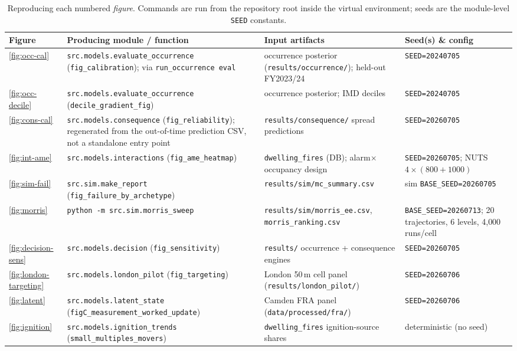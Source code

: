 \begin{table}[htbp]
  \centering
  \small
  \setlength{\tabcolsep}{4pt}
  \caption{Reproducing each numbered \emph{figure}. Commands are run from the
  repository root inside the virtual environment; seeds are the module-level
  \texttt{SEED} constants.}
  \label{tab:repro-fig1}
  \begin{tabular}{@{}p{1.5cm}p{4.4cm}p{4.0cm}p{4.3cm}@{}}
    \toprule
    Figure & Producing module / function & Input artifacts & Seed(s) \& config \\
    \midrule
    \ref{fig:occ-cal} & \texttt{src.models.evaluate\_occurrence}
      (\texttt{fig\_calibration}); via \texttt{run\_occurrence eval}
      & occurrence posterior (\texttt{results/occurrence/}); held-out FY2023/24
      & \texttt{SEED=20240705} \\
    \ref{fig:occ-decile} & \texttt{src.models.evaluate\_occurrence}
      (\texttt{decile\_gradient\_fig}) & occurrence posterior; IMD deciles
      & \texttt{SEED=20240705} \\
    \ref{fig:cons-cal} & \texttt{src.models.consequence} (\texttt{fig\_reliability});
      regenerated from the out-of-time prediction CSV, not a standalone entry point
      & \texttt{results/consequence/} spread predictions
      & \texttt{SEED=20260705} \\
    \ref{fig:int-ame} & \texttt{src.models.interactions} (\texttt{fig\_ame\_heatmap})
      & \texttt{dwelling\_fires} (DB); alarm$\times$occupancy design
      & \texttt{SEED=20260705}; NUTS $4\times(800{+}1000)$ \\
    \ref{fig:sim-fail} & \texttt{src.sim.make\_report}
      (\texttt{fig\_failure\_by\_archetype}) & \texttt{results/sim/mc\_summary.csv}
      & sim \texttt{BASE\_SEED=20260705} \\
    \ref{fig:morris} & \texttt{python -m src.sim.morris\_sweep}
      & \texttt{results/sim/morris\_ee.csv}, \texttt{morris\_ranking.csv}
      & \texttt{BASE\_SEED=20260713}; 20 trajectories, 6 levels, 4{,}000 runs/cell \\
    \ref{fig:decision-sens} & \texttt{src.models.decision} (\texttt{fig\_sensitivity})
      & \texttt{results/} occurrence + consequence engines
      & \texttt{SEED=20260705} \\
    \ref{fig:london-targeting} & \texttt{src.models.london\_pilot}
      (\texttt{fig\_targeting}) & London 50\,m cell panel
      (\texttt{results/london\_pilot/}) & \texttt{SEED=20260706} \\
    \ref{fig:latent} & \texttt{src.models.latent\_state}
      (\texttt{figC\_measurement\_worked\_update}) & Camden FRA panel
      (\texttt{data/processed/fra/}) & \texttt{SEED=20260706} \\
    \ref{fig:ignition} & \texttt{src.models.ignition\_trends}
      (\texttt{small\_multiples\_movers}) & \texttt{dwelling\_fires} ignition-source
      shares & deterministic (no seed) \\
    \bottomrule
  \end{tabular}
\end{table}

